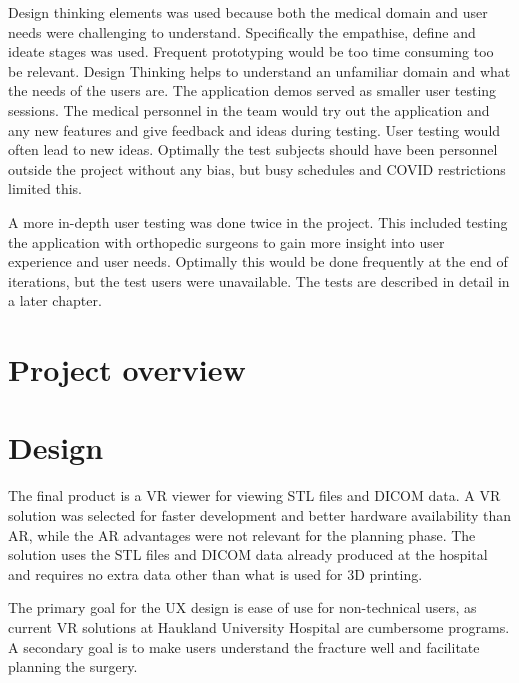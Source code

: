 \documentclass[a4paper]{report}
\begin{document}
Design thinking elements was used because both the medical domain and user needs were challenging to understand. Specifically the empathise, define and ideate stages was used. Frequent prototyping would be too time consuming too be relevant. Design Thinking helps to understand an unfamiliar domain and what the needs of the users are.
The application demos served as smaller user testing sessions. The medical personnel in the team would try out the application and any new features and give feedback and ideas during testing. User testing would often lead to new ideas. Optimally the test subjects should have been personnel outside the project without any bias, but busy schedules and COVID restrictions limited this.

A more in-depth user testing was done twice in the project. This included testing the application with orthopedic surgeons to gain more insight into user experience and user needs. Optimally this would be done frequently at the end of iterations, but the test users were unavailable. The tests are described in detail in a later chapter.

\section{Project overview}\label{CodeStructure}

\section{Design}


The final product is a VR viewer for viewing STL files and DICOM data. A VR solution was selected for faster development and better hardware availability than AR, while the AR advantages were not relevant for the planning phase.
The solution uses the STL files and DICOM data already produced at the hospital and requires no extra data other than what is used for 3D printing.

The primary goal for the UX design is ease of use for non-technical users, as current VR solutions at Haukland University Hospital are cumbersome programs.
A secondary goal is to make users understand the fracture well and facilitate planning the surgery.
\end{document}
